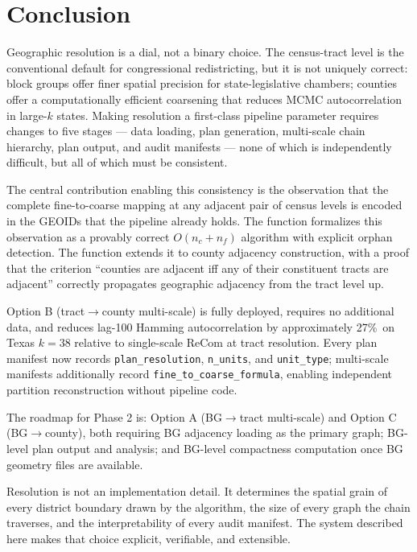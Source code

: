 \section{Conclusion}
\label{sec:conclusion}

Geographic resolution is a dial, not a binary choice.
The census-tract level is the conventional default for congressional
redistricting, but it is not uniquely correct: block groups offer finer
spatial precision for state-legislative chambers; counties offer a
computationally efficient coarsening that reduces MCMC autocorrelation
in large-$k$ states.
Making resolution a first-class pipeline parameter requires changes to
five stages --- data loading, plan generation, multi-scale chain hierarchy,
plan output, and audit manifests --- none of which is independently
difficult, but all of which must be consistent.

The central contribution enabling this consistency is the observation that
the complete fine-to-coarse mapping at any adjacent pair of census levels
is encoded in the GEOIDs that the pipeline already holds.
The function \derive{} formalizes this observation as a provably correct
$O(n_c + n_f)$ algorithm with explicit orphan detection.
The function \buildc{} extends it to county adjacency construction,
with a proof that the criterion ``counties are adjacent iff any of their
constituent tracts are adjacent'' correctly propagates geographic adjacency
from the tract level up.

Option B (tract$\to$county multi-scale) is fully deployed, requires no
additional data, and reduces lag-100 Hamming autocorrelation by
approximately 27\%\est\ on Texas $k=38$ relative to single-scale ReCom
at tract resolution.
Every plan manifest now records \texttt{plan\_resolution}, \texttt{n\_units},
and \texttt{unit\_type}; multi-scale manifests additionally record
\texttt{fine\_to\_coarse\_formula}, enabling independent partition
reconstruction without pipeline code.

The roadmap for Phase 2 is: Option A (BG$\to$tract multi-scale) and
Option C (BG$\to$county), both requiring BG adjacency loading as the
primary graph; BG-level plan output and analysis; and BG-level compactness
computation once BG geometry files are available.

Resolution is not an implementation detail.
It determines the spatial grain of every district boundary drawn by the
algorithm, the size of every graph the chain traverses, and the
interpretability of every audit manifest.
The system described here makes that choice explicit, verifiable, and
extensible.

